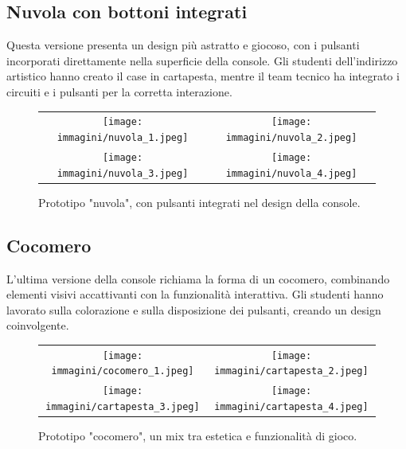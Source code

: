 \documentclass[a4paper,12pt]{report}
\begin{document}
\subsection{Nuvola con bottoni integrati}
Questa versione presenta un design più astratto e giocoso, con i pulsanti incorporati direttamente nella superficie della console. Gli studenti dell'indirizzo artistico hanno creato il case in cartapesta, mentre il team tecnico ha integrato i circuiti e i pulsanti per la corretta interazione.

\begin{figure}[h]
    \centering
    \begin{tabular}{c c}
        \texttt{[image: immagini/nuvola\_1.jpeg]} &
        \texttt{[image: immagini/nuvola\_2.jpeg]} \\
        \texttt{[image: immagini/nuvola\_3.jpeg]} &
        \texttt{[image: immagini/nuvola\_4.jpeg]} \\
    \end{tabular}
    \caption{Prototipo "nuvola", con pulsanti integrati nel design della console.}
    \label{fig:nuvola}
\end{figure}

\subsection{Cocomero}
L'ultima versione della console richiama la forma di un cocomero, combinando elementi visivi accattivanti con la funzionalità interattiva. Gli studenti hanno lavorato sulla colorazione e sulla disposizione dei pulsanti, creando un design coinvolgente.

\begin{figure}[h]
    \centering
    \begin{tabular}{c c}
        \texttt{[image: immagini/cocomero\_1.jpeg]} &
        \texttt{[image: immagini/cartapesta\_2.jpeg]} \\
        \texttt{[image: immagini/cartapesta\_3.jpeg]} &
        \texttt{[image: immagini/cartapesta\_4.jpeg]} \\
    \end{tabular}
    \caption{Prototipo "cocomero", un mix tra estetica e funzionalità di gioco.}
    \label{fig:cocomero}
\end{figure}
\end{document}
